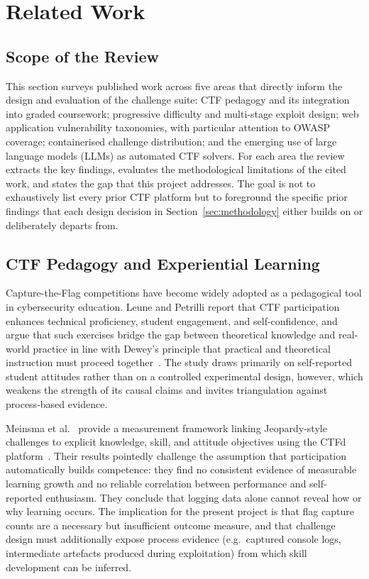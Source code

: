 \section{Related Work}
\label{sec:relatedwork}

\subsection{Scope of the Review}
This section surveys published work across five areas that directly
inform the design and evaluation of the challenge suite: CTF
pedagogy and its integration into graded coursework; progressive
difficulty and multi-stage exploit design; web application
vulnerability taxonomies, with particular attention to OWASP
coverage; containerised challenge distribution; and the emerging
use of large language models (LLMs) as automated CTF solvers. For
each area the review extracts the key findings, evaluates the
methodological limitations of the cited work, and states the gap
that this project addresses. The goal is not to exhaustively list
every prior CTF platform but to foreground the specific prior
findings that each design decision in
Section~\ref{sec:methodology} either builds on or deliberately
departs from.


\subsection{CTF Pedagogy and Experiential Learning}
Capture-the-Flag competitions have become widely adopted as a
pedagogical tool in cybersecurity education. Leune and Petrilli
\cite{KeesPetrelli} report that CTF participation enhances technical
proficiency, student engagement, and self-confidence, and argue that
such exercises bridge the gap between theoretical knowledge and
real-world practice in line with Dewey's principle that practical
and theoretical instruction must proceed together~\cite{Dewey1938}.
The study draws primarily on self-reported student attitudes rather
than on a controlled experimental design, however, which weakens the
strength of its causal claims and invites triangulation against
process-based evidence.

Meinsma et al.~\cite{Meinsma2022} provide a measurement framework
linking Jeopardy-style challenges to explicit knowledge, skill, and
attitude objectives using the CTFd platform~\cite{CTFd}. Their
results pointedly challenge the assumption that participation
automatically builds competence: they find no consistent evidence of
measurable learning growth and no reliable correlation between
performance and self-reported enthusiasm. They conclude that logging
data alone cannot reveal how or why learning occurs. The implication
for the present project is that flag capture counts are a necessary
but insufficient outcome measure, and that challenge design must
additionally expose process evidence (e.g.\ captured console logs,
intermediate artefacts produced during exploitation) from which
skill development can be inferred.

